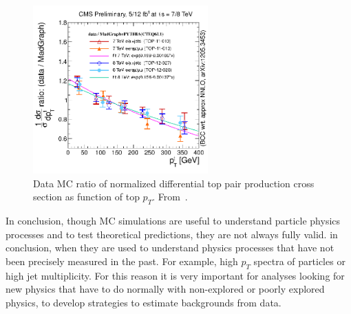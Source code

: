 \begin{figure}[!Hhtbp]
  \begin{center}
    \includegraphics[width=0.6\textwidth]{figs/topPtDataOverMadgraphPythia.png}
    \caption{Data MC ratio of normalized differential top pair production cross section as function of top $p_{T}$. From~\cite{Chatrchyan:2012saa,Chatrchyan:2013boa,Khachatryan:2015oqa}.}
    \label{fig:TopPTReweighting}
  \end{center}
\end{figure}

In conclusion, though MC simulations are useful to understand particle physics processes and to test theoretical predictions, they are not always fully valid. in conclusion, when they are used to understand physics processes that have not been precisely measured in the past. For example, high $p_{T}$ spectra of particles or high jet multiplicity. For this reason it is very important for analyses looking for new physics that have to do normally with non-explored or poorly explored physics, to develop strategies to estimate backgrounds from data.